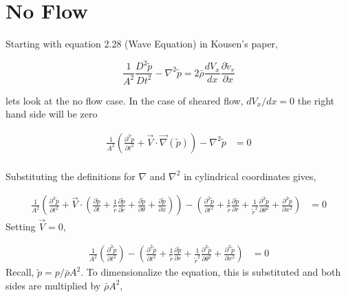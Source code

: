%
%
%
\section{No Flow}



Starting with equation 2.28 (Wave Equation) in Kousen's paper,



\begin{equation}
    \frac{1}{A^2}\frac{D^2\tilde{p}}{Dt^2} -
    \nabla^2 \tilde{p} =
    2 \bar{\rho} \frac{d V_x}{d x} \frac{\partial  \tilde{v}_r}{ \partial x} 
    \label{eqn:KousensWaveEquation}
\end{equation}


lets look at the no flow case. In the case of sheared flow, $dV_x/dx = 0$ the right hand side will be zero 



\begin{align*}
    \frac{1}{A^2}\left(
        \frac{\partial^2 \tilde{p}}{\partial t^2} + 
        \vec{V}\cdot \vec {\nabla} (\tilde{p}) 
    \right) -
    \nabla^2
    \tilde{p} &=
    0 \\
\end{align*}

Substituting the definitions for $\nabla$ and $\nabla^2$ in cylindrical 
coordinates gives,

\begin{align*} 
    \frac{1}{A^2}\left(
        \frac{\partial^2 \tilde{p}}{\partial t^2}
    + 
        \vec{V}\cdot \left(
            \frac{\partial\tilde{p}}{\partial t} + 
            \frac{1}{\tilde{r}}\frac{\partial \tilde{p} }{\partial \tilde{r}} +
            \frac{\partial \tilde{p}}{\partial \theta} +
            \frac{\partial \tilde{p}}{\partial x}  
        \right)  \right)-
        \left(
            \frac{\partial^2 \tilde{p}}{\partial t^2} + 
            \frac{1}{\tilde{r}}\frac{\partial \tilde{p}}{\partial r} +
            \frac{1}{\tilde{r}^2} \frac{\partial^2 \tilde{p}}{\partial \theta^2} + 
            \frac{\partial^2 \tilde{p}}{\partial x^2} 
        \right) &= 0  
\end{align*} 
Setting $\vec{V} = 0$,

\begin{align*} 
    \frac{1}{A^2}\left(
        \frac{\partial^2 \tilde{p}}{\partial t^2}
    \right) - 
        \left(
            \frac{\partial^2 \tilde{p}}{\partial t^2} + 
            \frac{1}{\tilde{r}}\frac{\partial \tilde{p}}{\partial  r}  +
            \frac{1}{\tilde{r}^2} \frac{\partial^2 \tilde{p}}{\partial \theta^2} + 
            \frac{\partial^2 \tilde{p}}{\partial x^2} 
        \right) &= 0  
\end{align*} 
Recall, $\tilde{p} = p/\bar{\rho} A^2$. To dimensionalize the equation, this is
substituted and both sides are multiplied by $\bar{\rho}A^2$,


